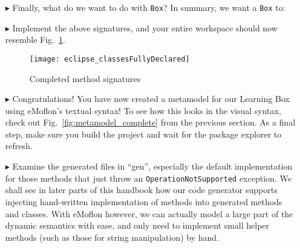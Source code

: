 \begin{itemize}
\clearpage

\item[$\blacktriangleright$] Finally, what do we want to do with \texttt{Box}? In summary, we want a \texttt{Box} to:


\item[$\blacktriangleright$] Implement the above signatures, and your entire workspace should now resemble Fig.~\ref{fig:workspaceMethods}.


\begin{figure}[htbp]
	\centering
  \texttt{[image: eclipse\_classesFullyDeclared]}
	\caption{Completed method signatures}
	\label{fig:workspaceMethods}
\end{figure}

\item[$\blacktriangleright$] Congratulations! You have now created a metamodel for our Learning Box using eMoflon's textual syntax! To see how
this looks in the visual syntax, check out Fig.~\ref{fig:metamodel_complete} from the previous section. As a final step, make sure you build the project and
wait for the package explorer to refresh. 

\item[$\blacktriangleright$] Examine the generated files in ``gen'', especially the default implementation for those methods that just throw an
\texttt{OperationNotSupported} exception. We shall see in later parts of this handbook how our code generator supports injecting hand-written
implementation of methods into generated methods and classes. With eMoflon however, we can actually model a large part of the dynamic semantics with ease, and
only need to implement small helper methods (such as those for string manipulation) by hand.


\end{itemize}